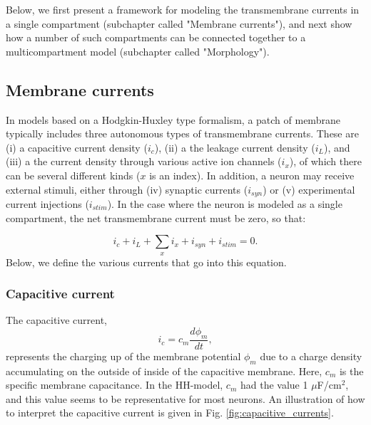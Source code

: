 Below, we first present a framework for modeling the transmembrane currents in a single compartment (subchapter called "Membrane currents"), and next show how a number of such compartments can be connected together to a multicompartment model (subchapter called "Morphology").


\subsection{Membrane currents}
In models based on a Hodgkin-Huxley type formalism, a patch of membrane typically includes three autonomous types of transmembrane currents. These are (i) a capacitive current density ($i_c$), (ii) a the leakage current density ($i_L$), and (iii) a the current density through various active ion channels ($i_x$), of which there can be several different kinds ($x$ is an index). In addition, a neuron may receive external stimuli, either through (iv) synaptic currents ($i_{syn}$) or (v) experimental current injections ($i_{stim}$). In the case where the neuron is modeled as a single compartment, the net transmembrane current must be zero, so that:

\begin{equation}
i_c + i_L + \sum_x{i_x} + i_{syn} + i_{stim} = 0.
\label{eq:singlecomp_zerosum}
\end{equation}
Below, we define the various currents that go into this equation.

\subsubsection{Capacitive current}
The capacitive current, 
\begin{equation}
i_c = c_m \frac{d\phi_m}{dt},
\label{eq:HHcap}
\end{equation}
represents the charging up of the membrane potential $\phi_m$ due to a charge density accumulating on the outside of inside of the capacitive membrane. Here, $c_m$ is the specific membrane capacitance. In the HH-model, $c_m$ had the value
1 $\mu$F/cm$^2$, and this value seems to be representative for most neurons.  An illustration of how to interpret the capacitive current is given in Fig. \ref{fig:capacitive_currents}. 

